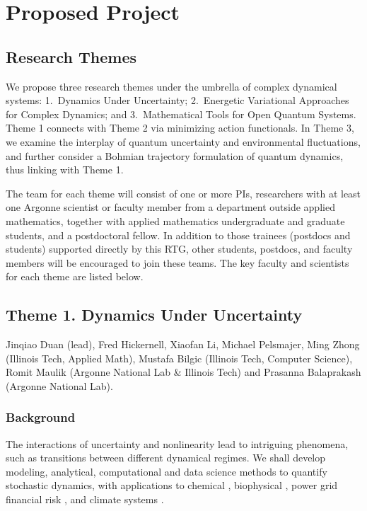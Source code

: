 \documentclass[11pt]{NSFamsart}
\begin{document}
\section{Proposed Project } \label{sec:researchproblems}
 

\subsection{Research Themes}

We propose three research themes under the umbrella of complex dynamical systems: 1.\ Dynamics Under Uncertainty; 2.\  Energetic Variational Approaches for Complex Dynamics; and 3.\ Mathematical Tools for Open Quantum Systems. Theme 1 connects with Theme 2 via minimizing action functionals. In Theme 3, we examine the interplay of quantum uncertainty and environmental fluctuations, and further consider a Bohmian trajectory formulation of quantum dynamics, thus linking with Theme 1. 

The team for each theme will consist of one or more PIs, researchers with at least one Argonne scientist or faculty member from a department outside applied mathematics, together with applied mathematics undergraduate and graduate students, and a postdoctoral
fellow. In addition to those trainees (postdocs and students) supported directly by this RTG, other students, postdocs, and faculty members will be encouraged to join these teams.  The key faculty and scientists for each theme are listed below.

 

\subsection*{Theme 1. Dynamics  Under Uncertainty } 
Jinqiao Duan (lead), Fred Hickernell, Xiaofan Li,  Michael Pelsmajer, Ming Zhong (Illinois Tech, Applied Math), Mustafa Bilgic (Illinois Tech, Computer Science),  Romit Maulik (Argonne National Lab \& Illinois Tech) and Prasanna Balaprakash (Argonne National Lab). 

\subsubsection*{Background} The interactions of uncertainty and nonlinearity lead to intriguing phenomena, such as  transitions between  different dynamical regimes. We shall develop modeling, analytical, computational and data science  methods to quantify stochastic dynamics, with applications to chemical \cite{agaoglou_chemical_2019}, biophysical \cite{Ruoff2018BiologicalCR}, power grid \cite{MEDJROUBI201714} financial risk \cite{DixHaBil20a,Gla03}, and climate systems \cite{Alexandrov2020NonlinearCD, Franzke2017NonlinearAS, Wan2020ADF}. 
 
\end{document}
